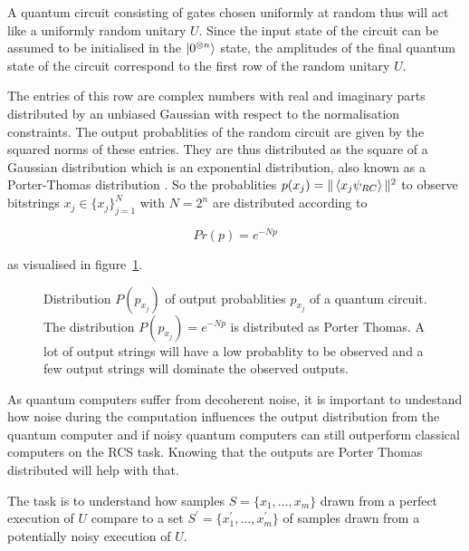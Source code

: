 A quantum circuit consisting of gates chosen uniformly at random thus
will act like a uniformly random unitary $U$. Since the input state of the circuit can be assumed to be
initialised in the $\Ket{0^{\otimes n}}$ state, the amplitudes of the final
quantum state of the circuit correspond to the first row of the random unitary $U$.

The entries of this row are complex numbers with real and imaginary parts
distributed by an unbiased Gaussian with respect to the normalisation constraints.
The output probablities of the random circuit are given by
the squared norms of these entries.
They are thus distributed as the square of
a Gaussian distribution which is an exponential distribution,
also known as a Porter-Thomas distribution \cite{Porter1956Fluctuations}. So the probablities $p(x_j) =
\| \Braket{x_j\psi_{RC}} \| ^2$ to observe bitstrings $x_j \in \{x_j\}_{j=1}^N$ with
$N=2^n$ are distributed according to

\begin{equation}
  Pr(p) = e^{-Np}
\end{equation}

as visualised in figure~\ref{fig:porterthomas}.

\begin{figure}[H]
  \label{fig:porterthomas}
  \centering
  \caption{Distribution $P(p_{x_j})$ of output probablities $p_{x_j}$ of a
    quantum circuit. The distribution $P(p_{x_j})=e^{-Np}$ is distributed as
    Porter Thomas. A lot of output strings will have a low probablity to be
    observed and a few output strings will dominate the observed outputs.}
\end{figure}

As quantum computers suffer from decoherent noise, it is
important to undestand how noise during the computation influences the output
distribution from the quantum computer and if noisy quantum computers can still
outperform classical computers on the RCS task. Knowing that the outputs are
Porter Thomas distributed will help with that.

The task is to understand how samples $S=\{x_1,\dots,x_m\}$ drawn from a perfect execution of
$U$ compare to a set $S^{\prime}=\{x_1^{\prime},\dots,x_m^{\prime}\}$ of samples drawn from a potentially noisy
execution of $U$.

